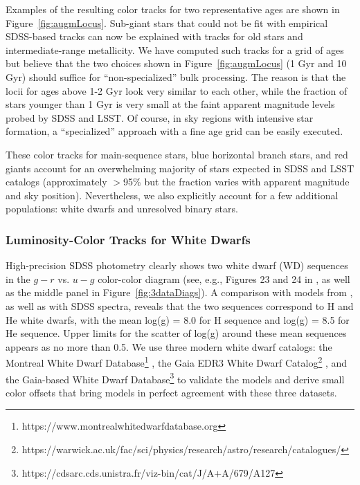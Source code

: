 Examples of the resulting color tracks for two representative ages are shown in Figure~\ref{fig:augmLocus}. Sub-giant stars that could not
be fit with empirical SDSS-based tracks can now be explained with tracks for old stars and intermediate-range metallicity. 
We have computed such tracks for a grid of ages but believe that the two choices shown in Figure~\ref{fig:augmLocus}
(1 Gyr and 10 Gyr) should suffice for ``non-specialized'' bulk processing. The reason is that the locii for ages above 1-2 Gyr look
very similar to each other, while the fraction of stars younger than 1 Gyr is very small at the faint apparent magnitude
levels probed by SDSS and LSST. Of course, in sky regions with intensive star formation, a ``specialized'' approach with
a fine age grid can be easily executed. 

These color tracks for main-sequence stars,  blue horizontal branch stars, and red giants account for an overwhelming majority of stars 
expected in SDSS and LSST catalogs (approximately $>$95\% but the fraction varies with apparent magnitude and sky position). 
Nevertheless, we also explicitly account for a few additional populations: white dwarfs and unresolved binary stars. 
 
 

\subsubsection{Luminosity-Color Tracks for White Dwarfs}

High-precision SDSS photometry clearly shows two white dwarf (WD) sequences in the $g-r$ vs. $u-g$ color-color diagram
(see, e.g., Figures 23 and 24 in \citealt{2007AJ....134..973I}, as well as the middle panel in Figure~\ref{fig:3dataDiags}).
A comparison with models from \cite{1995PASP..107.1047B}, as well as with SDSS spectra, reveals that the two sequences
correspond to H and He white dwarfs, with the mean log(g) = 8.0 for H sequence and log(g) = 8.5 for He sequence.
Upper limits for the scatter of log(g) around these mean sequences appears as no more than 0.5. 
We use three modern white dwarf catalogs: the Montreal White Dwarf
Database\footnote{https://www.montrealwhitedwarfdatabase.org} \citep{2017ASPC..509....3D}, the Gaia EDR3 White Dwarf Catalog\footnote{https://warwick.ac.uk/fac/sci/physics/research/astro/research/catalogues/} \citep{2021MNRAS.508.3877G}, 
and the Gaia-based White Dwarf Database\footnote{https://cdsarc.cds.unistra.fr/viz-bin/cat/J/A+A/679/A127} \citep{2023A&A...679A.127G}
to validate the \cite{1995PASP..107.1047B} models and derive small color offsets that bring models in perfect agreement with these three datasets.

